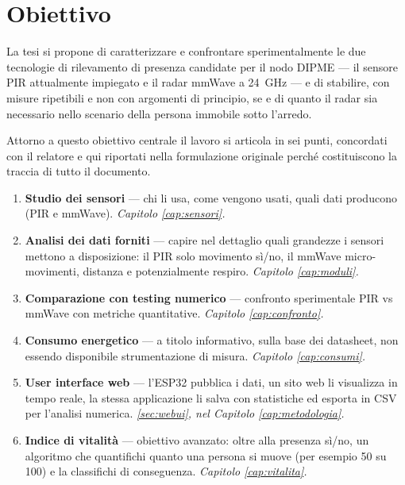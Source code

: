 \section{Obiettivo}
\label{sec:obiettivo}

La tesi si propone di caratterizzare e confrontare sperimentalmente le due tecnologie
di rilevamento di presenza candidate per il nodo DIPME --- il sensore PIR
attualmente impiegato e il radar mmWave a 24~GHz --- e di stabilire, con misure
ripetibili e non con argomenti di principio, se e di quanto il radar sia necessario
nello scenario della persona immobile sotto l'arredo.

Attorno a questo obiettivo centrale il lavoro si articola in sei punti, concordati con
il relatore e qui riportati nella formulazione originale perché costituiscono la
traccia di tutto il documento.

\begin{enumerate}[label=\textbf{O\arabic*.},leftmargin=2.6em,itemsep=4pt]
  \item \textbf{Studio dei sensori} --- chi li usa, come vengono usati, quali dati
        producono (PIR e mmWave). \emph{Capitolo \ref{cap:sensori}.}
  \item \textbf{Analisi dei dati forniti} --- capire nel dettaglio quali grandezze
        i sensori mettono a disposizione: il PIR solo movimento sì/no, il mmWave
        micro-movimenti, distanza e potenzialmente respiro.
        \emph{Capitolo \ref{cap:moduli}.}
  \item \textbf{Comparazione con testing numerico} --- confronto sperimentale
        PIR vs mmWave con metriche quantitative. \emph{Capitolo \ref{cap:confronto}.}
  \item \textbf{Consumo energetico} --- a titolo informativo, sulla base dei
        datasheet, non essendo disponibile strumentazione di misura.
        \emph{Capitolo \ref{cap:consumi}.}
  \item \textbf{User interface web} --- l'ESP32 pubblica i dati, un sito web li
        visualizza in tempo reale, la stessa applicazione li salva con statistiche
        ed esporta in CSV per l'analisi numerica. \emph{\cref{sec:webui}, nel
        Capitolo \ref{cap:metodologia}.}
  \item \textbf{Indice di vitalità} --- obiettivo avanzato: oltre alla presenza
        sì/no, un algoritmo che quantifichi quanto una persona si muove
        (per esempio 50 su 100) e la classifichi di conseguenza.
        \emph{Capitolo \ref{cap:vitalita}.}
\end{enumerate}

